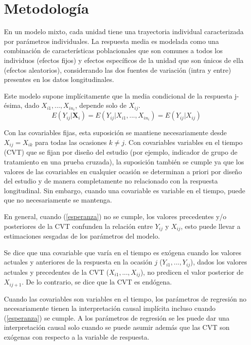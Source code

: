 \documentclass[12pt]{article}
\def\cvt{covariable que varía en el tiempo}
\def\xseqj{$X_{i1}, ..., X_{ij}$}
\def\xseqn{$X_{i1}, ..., X_{in_i}$}
\def\yseqj{$Y_{i1}, ..., Y_{ij}$}
\begin{document}
\newpage
\section{Metodología}

En un modelo mixto, cada unidad tiene una trayectoria individual caracterizada por parámetros individuales.
La respuesta media es modelada como una combinación de características poblacionales que son comunes a todos los
individuos (efectos fijos) y efectos específicos de la unidad que son únicos de ella (efectos aleatorios),
considerando las dos fuentes de variación (intra y entre) presentes en los datos longitudinales.

Este modelo supone implícitamente que la media condicional de la respuesta j-ésima, dado \xseqn{}, depende solo de $X_{ij}$.
\begin{equation}
\label{esperanza}
	E(Y_{ij}|\bm{X}_i) = E(Y_{ij}|X_{i1}, ..., X_{in_i}) = E(Y_{ij}|X_{ij})
\end{equation}

Con las covariables fijas, esta suposición se mantiene necesariamente desde $X_{ij} = X_{ik}$ para todas las ocasiones
$k \neq j$. Con covariables variables en el tiempo (CVT) que se fijan por diseño del estudio (por ejemplo, indicador
de grupo de tratamiento en una prueba cruzada), la suposición también se cumple ya que los valores de las covariables
en cualquier ocasión se determinan a priori por diseño del estudio y de manera completamente no relacionado con la
respuesta longitudinal. Sin embargo, cuando una covariable es variable en el tiempo, puede que no necesariamente se mantenga.

En general, cuando (\ref{esperanza}) no se cumple, los valores precedentes y/o posteriores de la CVT confunden la
relación entre $Y_{ij}$ y $X_{ij}$, esto puede llevar a estimaciones sesgadas de los parámetros del modelo.

Se dice que una \cvt{} es exógena cuando los valores actuales y anteriores de la respuesta en la ocasión
$j$ (\yseqj{}), dados los valores actuales y precedentes de la CVT (\xseqj{}), no predicen el valor
posterior de $X_{ij+1}$. De lo contrario, se dice que la CVT es endógena.

Cuando las covariables son variables en el tiempo, los parámetros de regresión no
necesariamente tienen la interpretación causal implícita incluso cuando (\ref{esperanza}) se cumple. A los parámetros de
regresión se les puede dar una interpretación causal solo cuando se puede asumir además que las CVT son exógenas con
respecto a la variable de respuesta.
\end{document}
